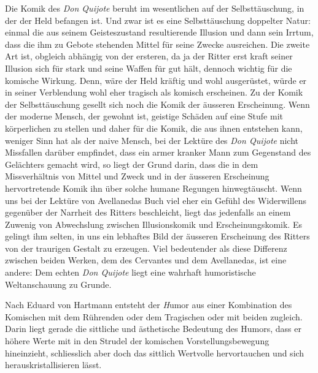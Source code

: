 Die Komik des {\it Don Quijote} beruht im wesentlichen auf der
Selbsttäuschung, in der der Held befangen ist. Und zwar ist es eine
Selbsttäuschung doppelter Natur: einmal die aus seinem Geisteszustand
resultierende Illusion und dann sein Irrtum, dass die ihm zu Gebote
stehenden Mittel für seine Zwecke ausreichen. Die zweite Art ist,
obgleich abhängig von der ersteren, da ja der Ritter erst kraft seiner
Illusion sich für stark und seine Waffen für gut hält, dennoch wichtig
für die komische Wirkung. Denn, wäre der Held kräftig und wohl
ausgerüstet, würde er in seiner Verblendung wohl eher tragisch als
komisch erscheinen. Zu der Komik der Selbsttäuschung gesellt sich
noch die Komik der äusseren Erscheinung. Wenn der moderne Mensch,
der gewohnt ist, geistige Schäden auf eine Stufe mit körperlichen zu
stellen und daher für die Komik, die aus ihnen entstehen kann,
weniger Sinn hat als der naive Mensch, bei der Lektüre des {\it Don
Quijote} nicht Missfallen darüber empfindet, dass ein armer kranker
Mann zum Gegenstand des Gelächters gemacht wird, so liegt der
Grund darin, dass die in dem Missverhältnis von Mittel und Zweck
und in der äusseren Erscheinung hervortretende Komik ihn über
solche humane Regungen hinwegtäuscht. Wenn uns bei der Lektüre
von Avellanedas Buch viel eher ein Gefühl des Widerwillens gegenüber
der Narrheit des Ritters beschleicht, liegt das jedenfalls an einem
Zuwenig von Abwechslung zwischen Illusionskomik und Erscheinungskomik.
Es gelingt ihm selten, in uns ein lebhaftes Bild der äusseren
Erscheinung des Ritters {\quoted von der traurigen Gestalt} zu erzeugen. Viel
bedeutender als diese Differenz zwischen beiden Werken, dem des
Cervantes und dem Avellanedas, ist eine andere: Dem echten {\it Don
Quijote} liegt eine wahrhaft humoristische Weltanschauung zu Grunde.

Nach Eduard von Hartmann entsteht der {\emph Humor} aus einer
Kombination des Komischen mit dem Rührenden oder dem Tragischen
oder mit beiden zugleich. Darin liegt gerade die sittliche und
ästhetische Bedeutung des Humors, dass er höhere Werte mit in den
Strudel der komischen Vorstellungsbewegung hineinzieht, schliesslich aber
doch das sittlich Wertvolle hervortauchen und sich herauskristallisieren lässt.

